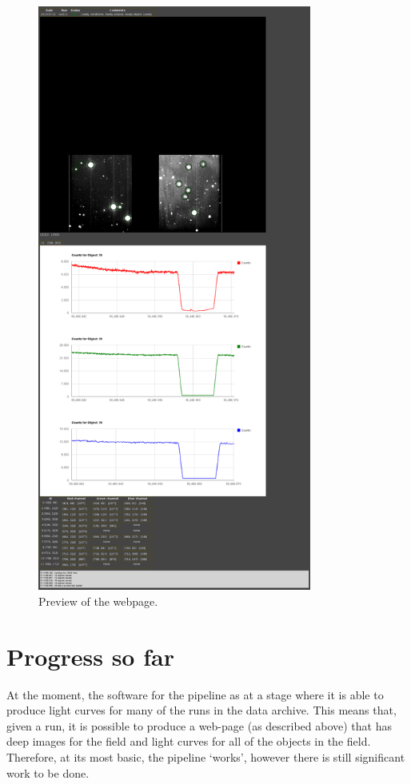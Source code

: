 \documentclass[a4paper,10pt]{article}
\begin{document}
\begin{figure}[!h]
	\centering
	\includegraphics[width=90mm]{images/browser.png}
	\caption{Preview of the webpage.}
	\label{browser}
\end{figure}

\section{Progress so far}
At the moment, the software for the pipeline as at a stage where it is able to produce light curves for many of the runs in the data archive. This means that, given a run, it is possible to produce a web-page (as described above) that has deep images for the field and light curves for all of the objects in the field. Therefore, at its most basic, the pipeline `works', however there is still significant work to be done. 
\end{document}
